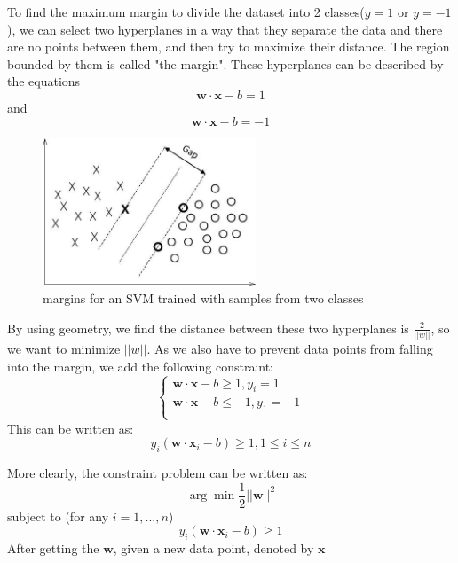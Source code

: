 \documentclass{vldb}
\begin{document}
\par  To find the maximum margin to divide the dataset into 2 classes($y=1$ or $y=-1$), we can select two hyperplanes in a way that they separate the data and there are no points between them, and then try to maximize their distance. The region bounded by them is called "the margin". These hyperplanes can be described by the equations
\begin{displaymath}
\mathbf{w}\cdot\mathbf{x}-b=1
\end{displaymath}
and
\begin{displaymath}
\mathbf{w}\cdot\mathbf{x}-b=-1
\end{displaymath}
\begin{figure}
\begin{center}
\includegraphics[width=2.50in]{SVM.jpeg}
\caption{margins for an SVM trained with samples from two classes}
\end{center}
\end{figure}
\par By using geometry, we find the distance between these two hyperplanes is $\frac{2}{||w||}$, so we want to minimize $||w||$. As we also have to prevent data points from falling into the margin, we add the following constraint:
\begin{displaymath}
\begin{cases}
\mathbf{w}\cdot\mathbf{x}-b\ge1,y_i=1\\
\mathbf{w}\cdot\mathbf{x}-b\le-1,y_1=-1\\
\end{cases}
\end{displaymath}
This can be written as:
\begin{displaymath}
y_i(\mathbf{w}\cdot\mathbf{x}_i-b)\ge1,1\le i \le n
\end{displaymath}
\par More clearly, the constraint problem can be written as:
\begin{displaymath}
\arg\min\frac{1}{2}||\mathbf{w}||^2
\end{displaymath}
subject to (for any $i = 1,...,n$)
\begin{displaymath}
y_i(\mathbf{w}\cdot\mathbf{x}_i-b)\ge1
\end{displaymath}
After getting the $\mathbf{w}$, given a new data point, denoted by $\mathbf{x}$
\end{document}
